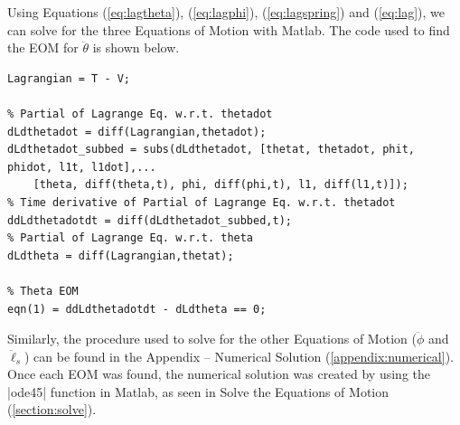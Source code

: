\documentclass[12pt]{report}
\begin{document}
\begin{flushleft}
Using Equations (\ref{eq:lagtheta}), (\ref{eq:lagphi}), (\ref{eq:lagspring}) and (\ref{eq:lag}), we can
solve for the three Equations of Motion with Matlab. The code used to find the EOM
for $\ddot{\theta}$ is shown below.

\begin{lstlisting}[frame=lines,style=Matlab-editor,basicstyle = \mlttfamily]
Lagrangian = T - V;

% Partial of Lagrange Eq. w.r.t. thetadot
dLdthetadot = diff(Lagrangian,thetadot);
dLdthetadot_subbed = subs(dLdthetadot, [thetat, thetadot, phit, phidot, l1t, l1dot],...
    [theta, diff(theta,t), phi, diff(phi,t), l1, diff(l1,t)]);
% Time derivative of Partial of Lagrange Eq. w.r.t. thetadot
ddLdthetadotdt = diff(dLdthetadot_subbed,t);
% Partial of Lagrange Eq. w.r.t. theta
dLdtheta = diff(Lagrangian,thetat);

% Theta EOM
eqn(1) = ddLdthetadotdt - dLdtheta == 0;
\end{lstlisting}
Similarly, the procedure used to solve for the other Equations of Motion ($\ddot{\phi}$ and $\ddot{\ell}_s$) can be found in the Appendix -- Numerical Solution (\ref{appendix:numerical}). Once each EOM was found, the numerical solution was created by using the |ode45| function in Matlab, as seen in Solve the Equations of Motion (\ref{section:solve}).

\end{flushleft}
\end{document}
